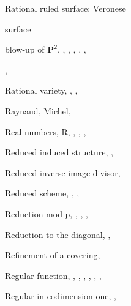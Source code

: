 {{\noindent\hspace*{15.0bp}Rational ruled surface; Veronese\par
\noindent\hspace*{15.0bp}surface\par
\noindent\hspace*{7.5bp}blow-up of $\mathbf P^2$, , , , , ,\par
\noindent\hspace*{15.0bp}, \par
\noindent\hspace*{0.0bp}Rational variety, , , \par
\noindent\hspace*{0.0bp}Raynaud, Michel, \par
\noindent\hspace*{0.0bp}Real numbers, R, , , , \par
\noindent\hspace*{0.0bp}Reduced induced structure, , \par
\noindent\hspace*{0.0bp}Reduced inverse image divisor, \par
\noindent\hspace*{0.0bp}Reduced scheme, , , \par
\noindent\hspace*{0.0bp}Reduction mod p, , , , \par
\noindent\hspace*{0.0bp}Reduction to the diagonal, , \par
}\hfill%
\parbox[t]{162.5bp}{\fontsize{8.05}{8.49}\selectfont%
\raggedright\setlength{\parskip}{0pt}%
\noindent\hspace*{0.0bp}Refinement of a covering, \par
\noindent\hspace*{0.0bp}Regular function, , , , , , , \par
\noindent\hspace*{0.0bp}Regular in codimension one, , \par
}}
